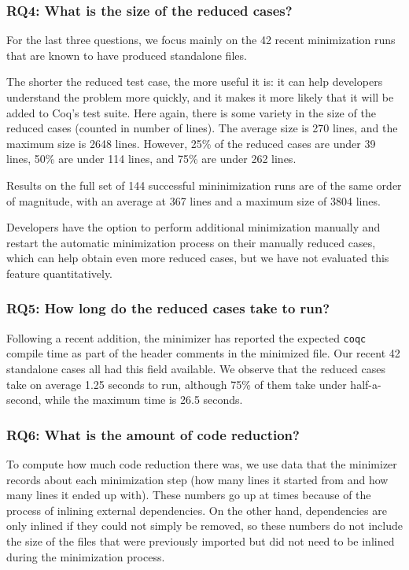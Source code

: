 \documentclass[a4paper,USenglish,cleveref,autoref,thm-restate]{lipics-v2021}
\begin{document}
\subsubsection{RQ4: What is the size of the reduced cases?}

For the last three questions, we focus mainly on the 42 recent minimization runs that are known to have produced standalone files.

The shorter the reduced test case, the more useful it is: it can help developers understand the problem more quickly, and it makes it more likely that it will be added to Coq's test suite. Here again, there is some variety in the size of the reduced cases (counted in number of lines). The average size is 270 lines, and the maximum size is 2648 lines. However, 25\% of the reduced cases are under 39 lines, 50\% are under 114 lines, and 75\% are under 262 lines.

Results on the full set of 144 successful mininimization runs are of the same order of magnitude, with an average at 367 lines and a maximum size of 3804 lines.

Developers have the option to perform additional minimization manually and restart the automatic minimization process on their manually reduced cases, which can help obtain even more reduced cases, but we have not evaluated this feature quantitatively.

\subsubsection{RQ5: How long do the reduced cases take to run?}

Following a recent addition, the minimizer has reported the expected \texttt{coqc} compile time as part of the header comments in the minimized file. Our recent 42 standalone cases all had this field available. We observe that the reduced cases take on average 1.25 seconds to run, although 75\% of them take under half-a-second, while the maximum time is 26.5 seconds.

\subsubsection{RQ6: What is the amount of code reduction?}

To compute how much code reduction there was, we use data that the minimizer records about each minimization step (how many lines it started from and how many lines it ended up with). These numbers go up at times because of the process of inlining external dependencies. On the other hand, dependencies are only inlined if they could not simply be removed, so these numbers do not include the size of the files that were previously imported but did not need to be inlined during the minimization process.
\end{document}
